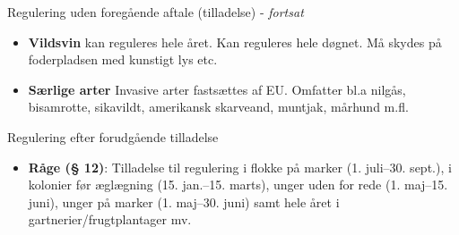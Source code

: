 \begin{frame}{Regulering uden foregående aftale (tilladelse) - \textit{fortsat}}

\vspace{1em}

\small

\raggedright

\begin{itemize}

\itemsep0.6em %

\item \textbf{Vildsvin} kan reguleres hele året. Kan reguleres hele døgnet. Må skydes på foderpladsen med kunstigt lys etc. 

\item \textbf{Særlige arter} Invasive arter fastsættes af EU. Omfatter bl.a nilgås, bisamrotte, sikavildt, amerikansk skarveand, muntjak, mårhund m.fl.     


\end{itemize}

\end{frame}

\begin{frame}{Regulering efter forudgående tilladelse}

\vspace{1em}

\small

\raggedright

\begin{itemize}
\itemsep0.6em


\item \textbf{Råge (§ 12)}: Tilladelse til regulering i flokke på marker (1. juli–30. sept.), i kolonier før æglægning (15. jan.–15. marts), unger uden for rede (1. maj–15. juni), unger på marker (1. maj–30. juni) samt hele året i gartnerier/frugtplantager mv.

\end{itemize}

\end{frame}

